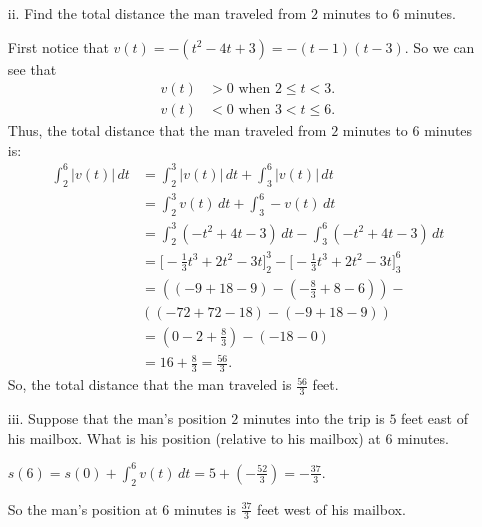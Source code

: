 \documentclass[nooutcomes, handout]{ximera}
\renewcommand{\d}{\,d}
\newcommand{\eval}[1]{\bigg[ #1 \bigg]}
\begin{document}
\begin{problem}
\begin{enumerate}
\begin{enumerate}
		\item[ii.]  Find the total distance the man traveled from $2$ minutes to $6$ minutes. 
			\begin{freeResponse}
			First notice that $v(t) = -(t^2 - 4t + 3) = -(t-1)(t-3)$.  So we can see that
				\begin{align*}
				v(t) &> 0 \text{ when }  2 \leq t < 3.  \\
				v(t) &< 0 \text{ when } 3 < t \leq 6.
				\end{align*}
			Thus, the total distance that the man traveled from $2$ minutes to $6$ minutes is:
				\begin{align*}
				\int_2^6 \left| v(t) \right| \d t &= \int_2^3 \left| v(t) \right| \d t + \int_3^6 \left| v(t) \right| \d t  \\
				&= \int_2^3 v(t) \d t + \int_3^6 - v(t) \d t  \\
				&= \int_2^3 (-t^2 + 4t - 3) \d t - \int_3^6 (-t^2 + 4t - 3) \d t  \\
				&= \eval{- \frac{1}{3} t^3 + 2t^2 - 3t}_2^3 - \eval{- \frac{1}{3} t^3 + 2t^2 - 3t}_3^6  \\
				&= \left( (-9+18-9) - (- \frac{8}{3} + 8 - 6) \right) -  \\
				& \left( (-72+72-18)-(-9+18-9) \right)  \\
				&= \left(0 - 2 + \frac{8}{3} \right) - \left( -18 - 0 \right)  \\
				&=  16 + \frac{8}{3} = \frac{56}{3}.
				\end{align*}
			So, the total distance that the man traveled is $\frac{56}{3}$ feet.
			\end{freeResponse}
				
		\item[iii.]  Suppose that the man's position $2$ minutes into the trip is $5$ feet east of his mailbox.  What is his position (relative to his mailbox) at $6$ minutes.
			\begin{freeResponse}
			$s(6) = s(0) + \int_2^6 v(t) \d t = 5 + \left(- \frac{52}{3} \right) = - \frac{37}{3}. $
			
			So the man's position at $6$ minutes is $\frac{37}{3}$ feet west of his mailbox.
			\end{freeResponse}
				
		\end{enumerate}
		
		
		

\end{enumerate}
\end{problem}
\end{document}

